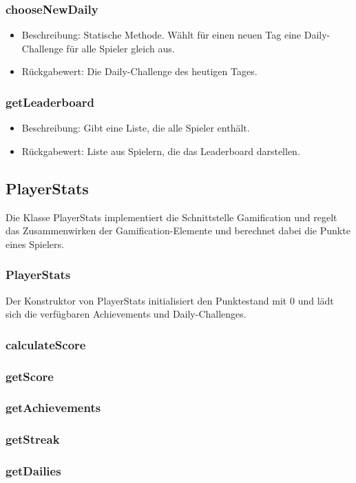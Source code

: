 \documentclass[a4paper]{scrreprt}
\begin{document}
	\subsubsection{chooseNewDaily}
	\begin{itemize}
		\item Beschreibung: Statische Methode. Wählt für einen neuen Tag eine Daily-Challenge für alle Spieler gleich aus.
		\item Rückgabewert: Die Daily-Challenge des heutigen Tages.
	\end{itemize}
	\subsubsection{getLeaderboard}
	\begin{itemize}
		\item Beschreibung: Gibt eine Liste, die alle Spieler enthält.
		\item Rückgabewert: Liste aus Spielern, die das Leaderboard darstellen.
	\end{itemize}
	
	
	\subsection{PlayerStats}
	Die Klasse PlayerStats implementiert die Schnittstelle Gamification und regelt das Zusammenwirken der Gamification-Elemente und berechnet dabei die Punkte eines Spielers.
	\subsubsection{PlayerStats}
	Der Konstruktor von PlayerStats initialisiert den Punktestand mit 0 und lädt sich die verfügbaren Achievements und Daily-Challenges.
	\subsubsection{calculateScore}
	\subsubsection{getScore}
	\subsubsection{getAchievements}
	\subsubsection{getStreak}
	\subsubsection{getDailies}
\end{document}
